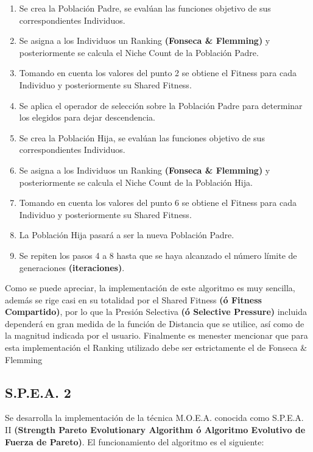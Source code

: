 \documentclass[class=report, crop=false]{standalone}
\begin{document}
\begin{enumerate} 
\item Se crea la Población Padre, se evalúan las funciones objetivo de sus correspondientes Individuos.
\item Se asigna a los Individuos un Ranking \textbf{(Fonseca \& Flemming)} y posteriormente se calcula el Niche Count de la Población Padre.
\item Tomando en cuenta los valores del punto 2 se obtiene el Fitness para cada Individuo y posteriormente su Shared Fitness.
\item Se aplica el operador de selección sobre la Población Padre para determinar los elegidos para dejar descendencia.
\item Se crea la Población Hija, se evalúan las funciones objetivo de sus correspondientes Individuos.
\item Se asigna a los Individuos un Ranking \textbf{(Fonseca \& Flemming)} y posteriormente se calcula el Niche Count de la Población Hija.
\item Tomando en cuenta los valores del punto 6 se obtiene el Fitness para cada Individuo y posteriormente su Shared Fitness.
\item La Población Hija pasará a ser la nueva Población Padre.
\item Se repiten los pasos 4 a 8 hasta que se haya alcanzado el número límite de generaciones \textbf{(iteraciones)}.
\end{enumerate}

Como se puede apreciar, la implementación de este algoritmo es 
muy sencilla, además se rige casi en su totalidad por el 
Shared Fitness \textbf{(ó Fitness Compartido)}, por lo que 
la Presión Selectiva \textbf{(ó Selective Pressure)} incluida 
dependerá en gran medida de la función de Distancia que se utilice, 
así como de la magnitud indicada por el usuario.\medskip\break
Finalmente es menester mencionar que para esta implementación el 
Ranking utilizado debe ser estrictamente el de Fonseca \& Flemming 

\subsection{S.P.E.A. 2}
Se desarrolla la implementación de la técnica M.O.E.A. 
conocida como S.P.E.A. II \textbf{(Strength Pareto Evolutionary Algorithm ó Algoritmo Evolutivo de Fuerza de Pareto)}.\break
El funcionamiento del algoritmo es el siguiente:
\end{document}
